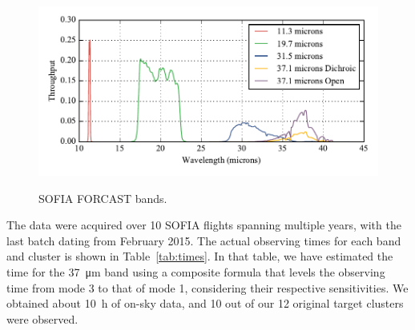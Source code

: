 \begin{figure}[!h]
\begin{center}
\includegraphics[width=\textwidth]{Figures/SOFIA_bands.pdf}
\label{fig:SOFIAbands}
\caption[SOFIA bands]{SOFIA FORCAST bands.}
\end{center}
\end{figure}

The data were acquired over 10 SOFIA flights spanning multiple years, with the last batch dating from February 2015. The actual observing times for each band and cluster is shown in Table~\ref{tab:times}. In that table, we have estimated the time for the \SI{37}{\um} band using a composite formula that levels the observing time from mode 3 to that of mode 1, considering their respective sensitivities. We obtained about \SI{10}{\hour} of on-sky data, and 10 out of our 12 original target clusters were observed.

